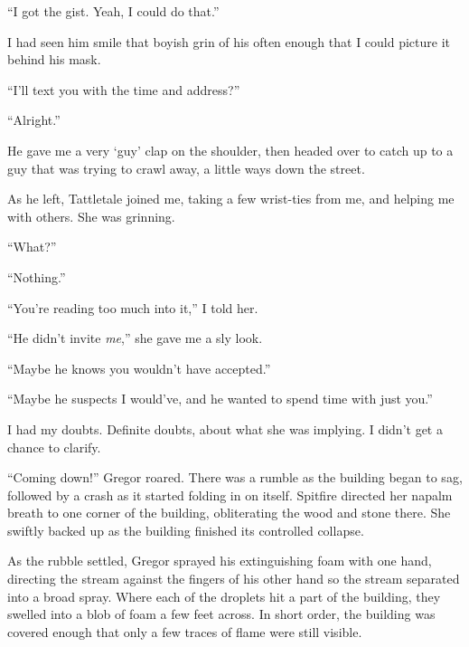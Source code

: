 ``I got the gist.  Yeah, I could do that.''



I had seen him smile that boyish grin of his often enough that I could picture it behind his mask.



``I'll text you with the time and address?''



``Alright.''



He gave me a very `guy' clap on the shoulder, then headed over to catch up to a guy that was trying to crawl away, a little ways down the street.



As he left, Tattletale joined me, taking a few wrist-ties from me, and helping me with others.  She was grinning.



``What?''



``Nothing.''



``You're reading too much into it,'' I told her.



``He didn't invite \emph{me},'' she gave me a sly look.



``Maybe he knows you wouldn't have accepted.''



``Maybe he suspects I would've, and he wanted to spend time with just you.''



I had my doubts.  Definite doubts, about what she was implying.  I didn't get a chance to clarify.



``Coming down!'' Gregor roared.  There was a rumble as the building began to sag, followed by a crash as it started folding in on itself.  Spitfire directed her napalm breath to one corner of the building, obliterating the wood and stone there.  She swiftly backed up as the building finished its controlled collapse.



As the rubble settled, Gregor sprayed his extinguishing foam with one hand, directing the stream against the fingers of his other hand so the stream separated into a broad spray.  Where each of the droplets hit a part of the building, they swelled into a blob of foam a few feet across.  In short order, the building was covered enough that only a few traces of flame were still visible.



